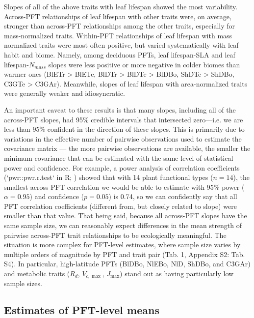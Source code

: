 \documentclass{article}
\begin{document}
Slopes of all of the above traits with leaf lifespan showed the most variability.
Across-PFT relationships of leaf lifespan with other traits were, on average, stronger than across-PFT relationships among the other traits, especially for mass-normalized traits.
Within-PFT relationships of leaf lifespan with mass normalized traits were most often positive, but varied systematically with leaf habit and biome.
Namely, among deciduous PFTs, leaf lifespan-SLA and leaf lifespan-$N_{mass}$ slopes were less positive or more negative in colder biomes than warmer ones
(BlETr > BlETe, BlDTr > BlDTe > BlDBo, ShDTe > ShDBo, C3GTe > C3GAr).
Meanwhile, slopes of leaf lifespan with area-normalized traits were generally weaker and idiosyncratic.

An important caveat to these results is that many slopes, including all of the across-PFT slopes, had 95\% credible intervals that intersected zero---i.e. we are less than 95\% confident in the direction of these slopes.
This is primarily due to variations in the effective number of pairwise observations used to estimate the covariance matrix ---
the more pairwise observations are available, the smaller the minimum covariance that can be estimated with the same level of statistical power and confidence.
For example, a power analysis of correlation coefficients (`pwr::pwr.r.test` in R; \citealt{r_pwr_package}) showed that with 14 plant functional types ($n = 14$),
the smallest across-PFT correlation we would be able to estimate with 95\% power ($\alpha = 0.95$) and confidence ($p = 0.05$) is 0.74,
so we can confidently say that all PFT correlation coefficients (different from, but closely related to slope) were smaller than that value.
That being said, because all across-PFT slopes have the same sample size,
we can reasonably expect differences in the mean strength of pairwise across-PFT trait relationships to be ecologically meaningful.
The situation is more complex for PFT-level estimates, where sample size varies by multiple orders of magnitude by PFT and trait pair (Tab. 1, Appendix S2: Tab. S4).
In particular, high-latitude PFTs (BlDBo, NlEBo, NlD, ShDBo, and C3GAr) and metabolic traits ($R_d$, $V_{c,\max}$, $J_{\max}$) stand out as having particularly low sample sizes.

\subsection{Estimates of PFT-level means}
\end{document}
